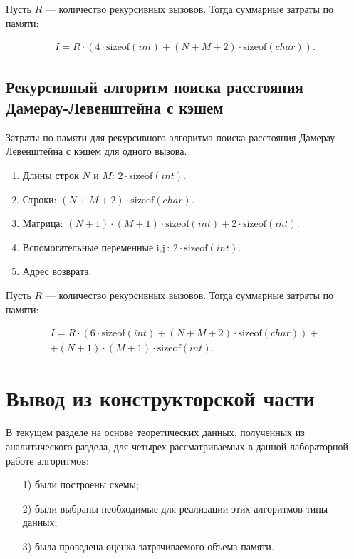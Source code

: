 Пусть $R$ --- количество рекурсивных вызовов. 
Тогда суммарные затраты по памяти: 

\begin{equation}
\begin{gathered}
I = R \cdot (4 \cdot \mbox{sizeof}(int) + (N + M + 2) \cdot \mbox{sizeof}(char)).
\end{gathered}
\end{equation}

\subsection{Рекурсивный алгоритм поиска расстояния Дамерау-Левенштейна с кэшем}

Затраты по памяти для рекурсивного алгоритма поиска расстояния Дамерау-Левенштейна с кэшем для одного вызова.

\begin{enumerate}
\item Длины строк $N$ и $M$: $2 \cdot \mbox{sizeof}(int)$.
\item Строки: $(N + M + 2) \cdot \mbox{sizeof}(char)$.
\item Матрица: $(N + 1) \cdot (M + 1) \cdot \mbox{sizeof}(int) + 2 \cdot \mbox{sizeof}(int)$.
\item Вспомогательные переменные $\mbox{i}, \mbox{j}$: $2 \cdot \mbox{sizeof}(int)$.
\item Адрес возврата.
\end{enumerate}

Пусть $R$ --- количество рекурсивных вызовов. 
Тогда суммарные затраты по памяти:

\begin{equation}
\begin{gathered}
I = R \cdot (6 \cdot \mbox{sizeof}(int) + (N + M + 2) \cdot \mbox{sizeof}(char)) + \\ + (N + 1) \cdot (M + 1) \cdot \mbox{sizeof}(int).
\end{gathered}
\end{equation}

\section*{Вывод из конструкторской части}

В текущем разделе на основе теоретических данных, полученных из аналитического раздела, для четырех рассматриваемых в данной лабораторной работе алгоритмов:

\begin{enumerate}
\item[1)] были построены схемы;
\item[2)] были выбраны необходимые для реализации этих алгоритмов типы данных;
\item[3)] была проведена оценка затрачиваемого объема памяти.
\end{enumerate}
